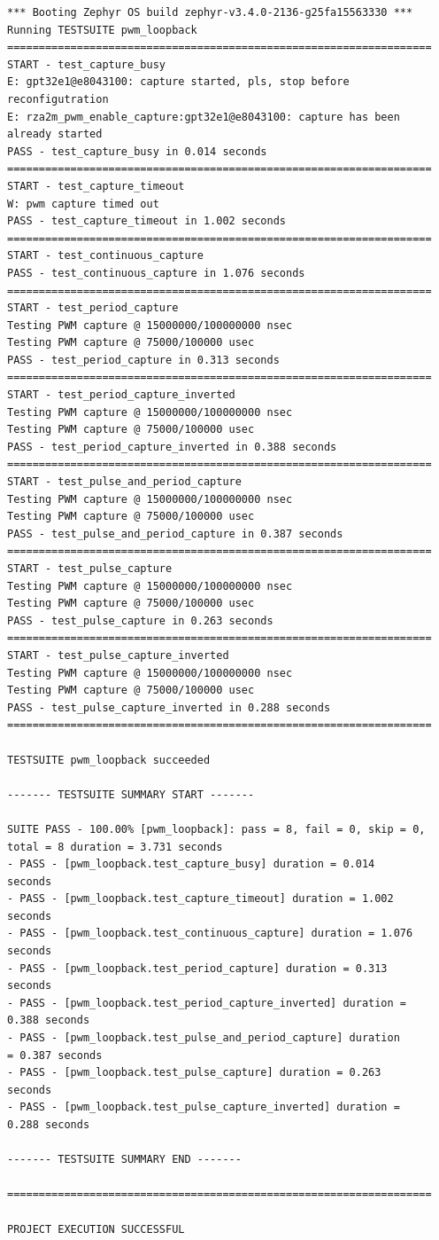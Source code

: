 \documentclass[11pt,a4paper,oneside]{article}
\begin{document}
\begin{lstlisting}
*** Booting Zephyr OS build zephyr-v3.4.0-2136-g25fa15563330 ***
Running TESTSUITE pwm_loopback
===================================================================
START - test_capture_busy
E: gpt32e1@e8043100: capture started, pls, stop before reconfigutration
E: rza2m_pwm_enable_capture:gpt32e1@e8043100: capture has been
already started
PASS - test_capture_busy in 0.014 seconds
===================================================================
START - test_capture_timeout
W: pwm capture timed out
PASS - test_capture_timeout in 1.002 seconds
===================================================================
START - test_continuous_capture
PASS - test_continuous_capture in 1.076 seconds
===================================================================
START - test_period_capture
Testing PWM capture @ 15000000/100000000 nsec
Testing PWM capture @ 75000/100000 usec
PASS - test_period_capture in 0.313 seconds
===================================================================
START - test_period_capture_inverted
Testing PWM capture @ 15000000/100000000 nsec
Testing PWM capture @ 75000/100000 usec
PASS - test_period_capture_inverted in 0.388 seconds
===================================================================
START - test_pulse_and_period_capture
Testing PWM capture @ 15000000/100000000 nsec
Testing PWM capture @ 75000/100000 usec
PASS - test_pulse_and_period_capture in 0.387 seconds
===================================================================
START - test_pulse_capture
Testing PWM capture @ 15000000/100000000 nsec
Testing PWM capture @ 75000/100000 usec
PASS - test_pulse_capture in 0.263 seconds
===================================================================
START - test_pulse_capture_inverted
Testing PWM capture @ 15000000/100000000 nsec
Testing PWM capture @ 75000/100000 usec
PASS - test_pulse_capture_inverted in 0.288 seconds
===================================================================

TESTSUITE pwm_loopback succeeded

------- TESTSUITE SUMMARY START -------

SUITE PASS - 100.00% [pwm_loopback]: pass = 8, fail = 0, skip = 0,
total = 8 duration = 3.731 seconds
- PASS - [pwm_loopback.test_capture_busy] duration = 0.014
seconds
- PASS - [pwm_loopback.test_capture_timeout] duration = 1.002
seconds
- PASS - [pwm_loopback.test_continuous_capture] duration = 1.076
seconds
- PASS - [pwm_loopback.test_period_capture] duration = 0.313
seconds
- PASS - [pwm_loopback.test_period_capture_inverted] duration =
0.388 seconds
- PASS - [pwm_loopback.test_pulse_and_period_capture] duration
= 0.387 seconds
- PASS - [pwm_loopback.test_pulse_capture] duration = 0.263
seconds
- PASS - [pwm_loopback.test_pulse_capture_inverted] duration =
0.288 seconds

------- TESTSUITE SUMMARY END -------

===================================================================

PROJECT EXECUTION SUCCESSFUL
\end{lstlisting}
\end{document}
